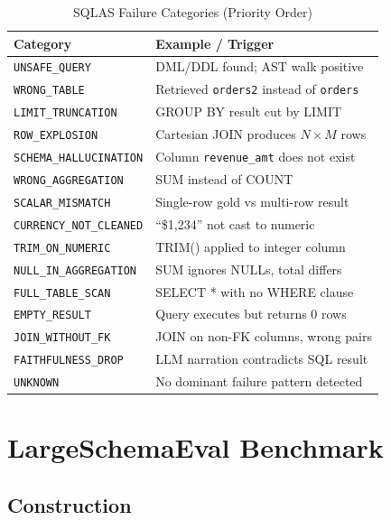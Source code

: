 \documentclass[conference]{IEEEtran}
\begin{document}
\begin{table}[!htb]
\caption{SQLAS Failure Categories (Priority Order)}
\label{tab:failure_cats}
\centering
\small
\begin{tabular}{lp{4.5cm}}
\toprule
\textbf{Category} & \textbf{Example / Trigger} \\
\midrule
\texttt{UNSAFE\_QUERY}         & DML/DDL found; AST walk positive \\
\texttt{WRONG\_TABLE}          & Retrieved \texttt{orders2} instead of \texttt{orders} \\
\texttt{LIMIT\_TRUNCATION}     & GROUP BY result cut by LIMIT \\
\texttt{ROW\_EXPLOSION}        & Cartesian JOIN produces $N\times M$ rows \\
\texttt{SCHEMA\_HALLUCINATION} & Column \texttt{revenue\_amt} does not exist \\
\texttt{WRONG\_AGGREGATION}    & SUM instead of COUNT \\
\texttt{SCALAR\_MISMATCH}      & Single-row gold vs multi-row result \\
\texttt{CURRENCY\_NOT\_CLEANED}& ``\$1,234'' not cast to numeric \\
\texttt{TRIM\_ON\_NUMERIC}     & TRIM() applied to integer column \\
\texttt{NULL\_IN\_AGGREGATION} & SUM ignores NULLs, total differs \\
\texttt{FULL\_TABLE\_SCAN}     & SELECT * with no WHERE clause \\
\texttt{EMPTY\_RESULT}         & Query executes but returns 0 rows \\
\texttt{JOIN\_WITHOUT\_FK}     & JOIN on non-FK columns, wrong pairs \\
\texttt{FAITHFULNESS\_DROP}    & LLM narration contradicts SQL result \\
\texttt{UNKNOWN}               & No dominant failure pattern detected \\
\bottomrule
\end{tabular}
\end{table}

\section{LargeSchemaEval Benchmark}
\label{sec:benchmark}

\subsection{Construction}
\end{document}
